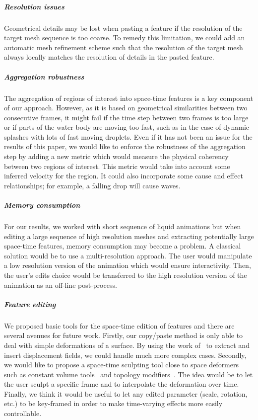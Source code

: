 \documentclass[review]{acmsiggraph}
\begin{document}
\subparagraph{Resolution issues} 
Geometrical details may be lost when pasting a feature if the resolution of the target mesh sequence is too coarse. 
To remedy this limitation, we could add an automatic mesh refinement scheme such that the resolution of the target mesh always locally matches the resolution of details in the pasted feature.

\subparagraph{Aggregation robustness} 
The aggregation of regions of interest into space-time features is a key component of our approach. 
However, as it is based on geometrical similarities between two consecutive frames, it might fail if the time step between two frames is too large or if parts of the water body are moving too fast, such as in the case of dynamic splashes with lots of fast moving droplets. 
Even if it has not been an issue for the results of this paper, we would like to enforce the robustness of the aggregation step by adding a new metric which would measure the physical coherency between two regions of interest. 
This metric would take into account some inferred velocity for the region. It could also incorporate some cause and effect relationships; for example, a falling drop will cause waves. 

\subparagraph{Memory consumption} 
For our results, we worked with short sequence of liquid animations but when editing a large sequence of high resolution meshes and extracting potentially large space-time features, memory consumption may become a problem. 
A classical solution would be to use a multi-resolution approach.
The user would manipulate a low resolution version of the animation which would ensure interactivity. 
Then, the user's edits choice would be transferred to the high resolution version of the animation as an off-line post-process.

\subparagraph{Feature editing} 
We proposed basic tools for the space-time edition of features and there are several avenues for future work. 
Firstly, our copy/paste method is only able to deal with simple deformations of a surface. 
By using the work of~\cite{Takahashi2003} to extract and insert displacement fields, we could handle much more complex cases. 
Secondly, we would like to propose a space-time sculpting tool close to space deformers such as constant volume tools~\cite{Angelidis2006b,funk2006vector} and topology modifiers~\cite{stanculescu2011freestyle}. 
The idea would be to let the user sculpt a specific frame and to interpolate the deformation over time. 
Finally, we think it would be useful to let any edited parameter (scale, rotation, etc.) to be key-framed in order to make time-varying effects more easily controllable.
\end{document}
